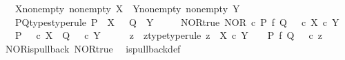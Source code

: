 \begin{isabellebody}
\ \ \ X{\isacharunderscore}{\kern0pt}nonempty{\isacharcolon}{\kern0pt}\ {\isachardoublequoteopen}nonempty\ X{\isachardoublequoteclose}\ \ Y{\isacharunderscore}{\kern0pt}nonempty{\isacharcolon}{\kern0pt}\ {\isachardoublequoteopen}nonempty\ Y{\isachardoublequoteclose}\isanewline
\ \ \ P{\isacharunderscore}{\kern0pt}Q{\isacharunderscore}{\kern0pt}types{\isacharbrackleft}{\kern0pt}type{\isacharunderscore}{\kern0pt}rule{\isacharbrackright}{\kern0pt}{\isacharcolon}{\kern0pt}\ {\isachardoublequoteopen}P\ {\isacharcolon}{\kern0pt}\ X\ {\isasymrightarrow}\ {\isasymOmega}{\isachardoublequoteclose}\ {\isachardoublequoteopen}Q\ {\isacharcolon}{\kern0pt}\ Y\ {\isasymrightarrow}\ {\isasymOmega}{\isachardoublequoteclose}\isanewline
\ \ \ NOR{\isacharunderscore}{\kern0pt}true{\isacharcolon}{\kern0pt}\ {\isachardoublequoteopen}NOR\ {\isasymcirc}\isactrlsub c\ {\isacharparenleft}{\kern0pt}P\ {\isasymtimes}\isactrlsub f\ Q{\isacharparenright}{\kern0pt}\ {\isacharequal}{\kern0pt}\ {\isasymt}\ {\isasymcirc}\isactrlsub c\ {\isasymbeta}\isactrlbsub X\ {\isasymtimes}\isactrlsub c\ Y\isactrlesub {\isachardoublequoteclose}\isanewline
\ \ \ {\isachardoublequoteopen}P\ {\isacharequal}{\kern0pt}\ {\isasymf}\ {\isasymcirc}\isactrlsub c\ {\isasymbeta}\isactrlbsub X\isactrlesub \ {\isasymand}\ Q\ {\isacharequal}{\kern0pt}\ {\isasymf}\ {\isasymcirc}\isactrlsub c\ {\isasymbeta}\isactrlbsub Y\isactrlesub {\isachardoublequoteclose}\isanewline
%
\isadelimproof
%
\endisadelimproof
%
\isatagproof
{}\isamarkupfalse%
\ {\isacharminus}{\kern0pt}\isanewline
\ \ \isamarkupfalse%
\ z\ \ z{\isacharunderscore}{\kern0pt}type{\isacharbrackleft}{\kern0pt}type{\isacharunderscore}{\kern0pt}rule{\isacharbrackright}{\kern0pt}{\isacharcolon}{\kern0pt}\ {\isachardoublequoteopen}z\ {\isacharcolon}{\kern0pt}\ X\ {\isasymtimes}\isactrlsub c\ Y\ {\isasymrightarrow}\ {\isasymone}{\isachardoublequoteclose}\ \ {\isachardoublequoteopen}P\ {\isasymtimes}\isactrlsub f\ Q\ {\isacharequal}{\kern0pt}\ {\isasymlangle}{\isasymf}{\isacharcomma}{\kern0pt}{\isasymf}{\isasymrangle}\ {\isasymcirc}\isactrlsub c\ z{\isachardoublequoteclose}\isanewline
\ \ \ \ \isamarkupfalse%
\ NOR{\isacharunderscore}{\kern0pt}is{\isacharunderscore}{\kern0pt}pullback\ NOR{\isacharunderscore}{\kern0pt}true\ \isamarkupfalse%
\ is{\isacharunderscore}{\kern0pt}pullback{\isacharunderscore}{\kern0pt}def\isanewline
\ \ \ \ \isamarkupfalse%

\end{isabellebody}
